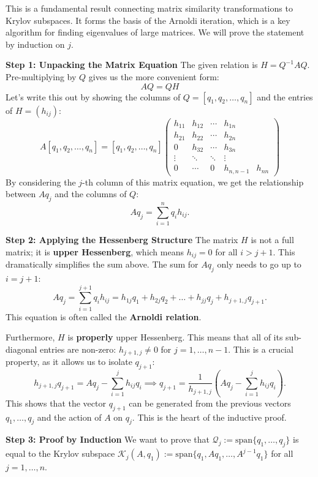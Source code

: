 \begin{solution}
This is a fundamental result connecting matrix similarity transformations to Krylov subspaces. It forms the basis of the Arnoldi iteration, which is a key algorithm for finding eigenvalues of large matrices. We will prove the statement by induction on $j$.

\textbf{Step 1: Unpacking the Matrix Equation}
The given relation is $H = Q^{-1}AQ$. Pre-multiplying by $Q$ gives us the more convenient form:
\[ AQ = QH \]
Let's write this out by showing the columns of $Q = [q_1, q_2, \dots, q_n]$ and the entries of $H = (h_{ij})$:
\[ A[q_1, q_2, \dots, q_n] = [q_1, q_2, \dots, q_n] \begin{pmatrix}
h_{11} & h_{12} & \cdots & h_{1n} \\
h_{21} & h_{22} & \cdots & h_{2n} \\
0 & h_{32} & \cdots & h_{3n} \\
\vdots & \ddots & \ddots & \vdots \\
0 & \cdots & 0 & h_{n,n-1} & h_{nn}
\end{pmatrix} \]
By considering the $j$-th column of this matrix equation, we get the relationship between $Aq_j$ and the columns of $Q$:
\[ A q_j = \sum_{i=1}^n q_i h_{ij}. \]

\textbf{Step 2: Applying the Hessenberg Structure}
The matrix $H$ is not a full matrix; it is \textbf{upper Hessenberg}, which means $h_{ij} = 0$ for all $i > j+1$. This dramatically simplifies the sum above. The sum for $Aq_j$ only needs to go up to $i = j+1$:
\[ A q_j = \sum_{i=1}^{j+1} q_i h_{ij} = h_{1j}q_1 + h_{2j}q_2 + \dots + h_{jj}q_j + h_{j+1,j}q_{j+1}. \]
This equation is often called the \textbf{Arnoldi relation}.

Furthermore, $H$ is \textbf{properly} upper Hessenberg. This means that all of its sub-diagonal entries are non-zero: $h_{j+1, j} \neq 0$ for $j=1, \dots, n-1$. This is a crucial property, as it allows us to isolate $q_{j+1}$:
\[ h_{j+1, j} q_{j+1} = A q_j - \sum_{i=1}^j h_{ij} q_i \implies q_{j+1} = \frac{1}{h_{j+1, j}} \left( A q_j - \sum_{i=1}^j h_{ij} q_i \right). \]
This shows that the vector $q_{j+1}$ can be generated from the previous vectors $q_1, \dots, q_j$ and the action of $A$ on $q_j$. This is the heart of the inductive proof.

\textbf{Step 3: Proof by Induction}
We want to prove that $\mathcal{Q}_j := \mathrm{span}\{q_1, \dots, q_j\}$ is equal to the Krylov subspace $\mathcal{K}_j(A, q_1) := \mathrm{span}\{q_1, Aq_1, \dots, A^{j-1}q_1\}$ for all $j=1, \dots, n$.


\end{solution}
